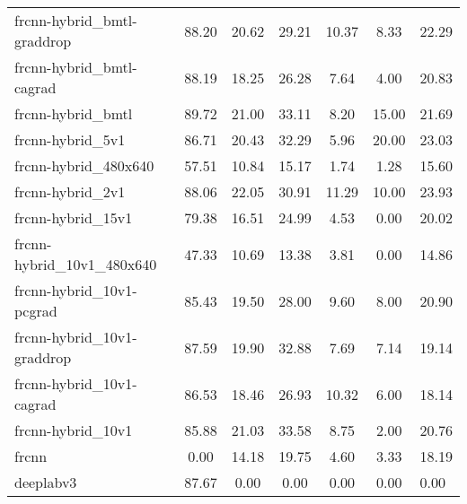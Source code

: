 \begin{table}[H]
\begin{tabular}{lccccc}
frcnn-hybrid_bmtl-graddrop & 88.20 & 20.62 & 29.21 & 10.37 & 8.33 & 22.29 \\
frcnn-hybrid_bmtl-cagrad & 88.19 & 18.25 & 26.28 & 7.64 & 4.00 & 20.83 \\
frcnn-hybrid_bmtl & 89.72 & 21.00 & 33.11 & 8.20 & 15.00 & 21.69 \\
frcnn-hybrid_5v1 & 86.71 & 20.43 & 32.29 & 5.96 & 20.00 & 23.03 \\
frcnn-hybrid_480x640 & 57.51 & 10.84 & 15.17 & 1.74 & 1.28 & 15.60 \\
frcnn-hybrid_2v1 & 88.06 & 22.05 & 30.91 & 11.29 & 10.00 & 23.93 \\
frcnn-hybrid_15v1 & 79.38 & 16.51 & 24.99 & 4.53 & 0.00 & 20.02 \\
frcnn-hybrid_10v1_480x640 & 47.33 & 10.69 & 13.38 & 3.81 & 0.00 & 14.86 \\
frcnn-hybrid_10v1-pcgrad & 85.43 & 19.50 & 28.00 & 9.60 & 8.00 & 20.90 \\
frcnn-hybrid_10v1-graddrop & 87.59 & 19.90 & 32.88 & 7.69 & 7.14 & 19.14 \\
frcnn-hybrid_10v1-cagrad & 86.53 & 18.46 & 26.93 & 10.32 & 6.00 & 18.14 \\
frcnn-hybrid_10v1 & 85.88 & 21.03 & 33.58 & 8.75 & 2.00 & 20.76 \\
frcnn & 0.00 & 14.18 & 19.75 & 4.60 & 3.33 & 18.19 \\
deeplabv3 & 87.67 & 0.00 & 0.00 & 0.00 & 0.00 & 0.00 \\
\bottomrule
\end{tabular}
\end{table}
